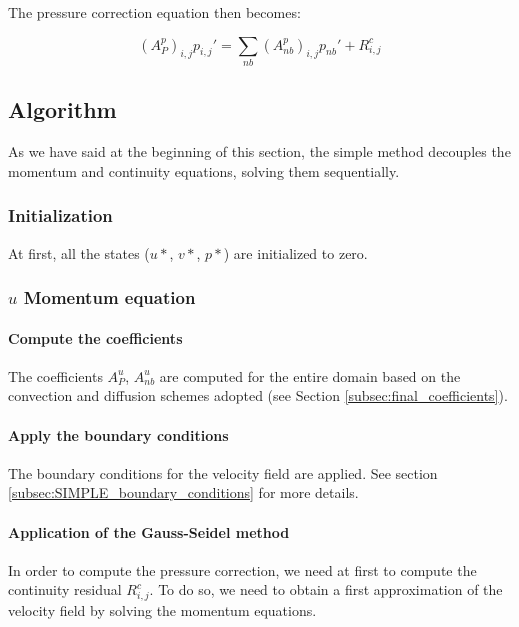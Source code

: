 The pressure correction equation then becomes:

\begin{equation}
    (A_P^p)_{i,j} p_{i,j}' = \sum_{nb} (A_{nb}^p)_{i,j} p_{nb}' + R^c_{i,j}
\end{equation}


\subsection{Algorithm}

As we have said at the beginning of this section, the \acrshort{simple} method decouples the momentum and continuity equations, solving them sequentially.

\subsubsection{Initialization}

At first, all the states ($u*$, $v*$, $p*$) are initialized to zero.

\subsubsection{$u$ Momentum equation}

\paragraph{Compute the coefficients}

The coefficients $A_P^u$, $A_{nb}^u$ are computed for the entire domain based on the convection and diffusion schemes adopted (see Section \ref{subsec:final_coefficients}).

\paragraph{Apply the boundary conditions}

The boundary conditions for the velocity field are applied. See section \ref{subsec:SIMPLE_boundary_conditions} for more details.

\paragraph{Application of the Gauss-Seidel method}

In order to compute the pressure correction, we need at first to compute the continuity residual $R^c_{i,j}$.
To do so, we need to obtain a first approximation of the velocity field by solving the momentum equations.

